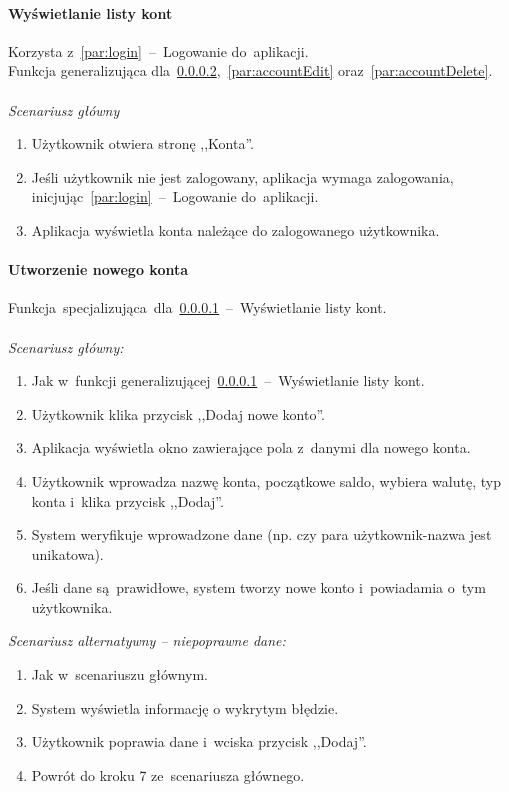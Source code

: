 \paragraph{Wyświetlanie listy kont\newline}
\label{par:accountsView}
Korzysta z~\ref{par:login}~--~Logowanie do~aplikacji.\\
\indent Funkcja generalizująca dla~\ref{par:accountCreate},~\ref{par:accountEdit} oraz~\ref{par:accountDelete}.\\\\
\textit{Scenariusz główny}
\begin{enumerate}
  \item Użytkownik otwiera stronę ,,Konta''.
  \item Jeśli użytkownik nie jest zalogowany, aplikacja wymaga zalogowania, inicjując~\ref{par:login}~--~Logowanie do~aplikacji.
  \item Aplikacja wyświetla konta należące do zalogowanego użytkownika.
\end{enumerate}

\paragraph{Utworzenie nowego konta\newline}
\label{par:accountCreate}
Funkcja~specjalizująca~dla~\ref{par:accountsView}~--~Wyświetlanie listy kont.\\\\
\textit{Scenariusz główny:}
\begin{enumerate}
  \item[1-3.] Jak w~funkcji generalizującej~\ref{par:accountsView}~--~Wyświetlanie listy kont.
  \item[4.] Użytkownik klika przycisk ,,Dodaj nowe konto''.
  \item[5.] Aplikacja wyświetla okno zawierające pola z~danymi dla nowego konta.
  \item[6.] Użytkownik wprowadza nazwę konta, początkowe saldo, wybiera walutę, typ konta i~klika przycisk ,,Dodaj''.
  \item[7.] System weryfikuje wprowadzone dane (np. czy para użytkownik-nazwa jest unikatowa).
  \item[8.] Jeśli dane są~prawidłowe, system tworzy nowe konto i~powiadamia o~tym użytkownika.
\end{enumerate}
\textit{Scenariusz alternatywny -- niepoprawne dane:}
\begin{enumerate}
  \item[1-7.] Jak w~scenariuszu głównym.
  \item[8.] System wyświetla informację o wykrytym błędzie.
  \item[9.] Użytkownik poprawia dane i~wciska przycisk ,,Dodaj''.
  \item[10.] Powrót do kroku 7 ze~scenariusza głównego.
\end{enumerate}

